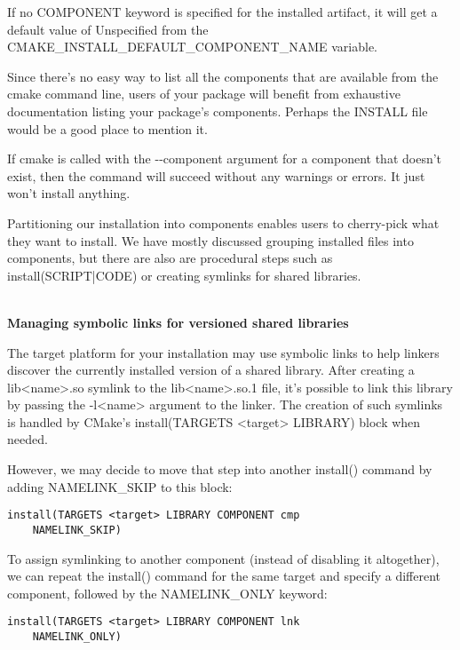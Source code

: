 If no COMPONENT keyword is specified for the installed artifact, it will get a default value of Unspecified from the CMAKE\_INSTALL\_DEFAULT\_COMPONENT\_NAME variable.

\begin{tcolorbox}[colback=blue!5!white,colframe=blue!75!black,title=Note]
Since there's no easy way to list all the components that are available from the cmake command line, users of your package will benefit from exhaustive documentation listing your package's components. Perhaps the INSTALL file would be a good place to mention it.
\end{tcolorbox}

If cmake is called with the -{}-component argument for a component that doesn't exist, then the command will succeed without any warnings or errors. It just won't install anything.

Partitioning our installation into components enables users to cherry-pick what they want to install. We have mostly discussed grouping installed files into components, but there are also are procedural steps such as install(SCRIPT|CODE) or creating symlinks for shared libraries.

\hspace*{\fill} \\ %
\noindent
\textbf{Managing symbolic links for versioned shared libraries}

The target platform for your installation may use symbolic links to help linkers discover the currently installed version of a shared library. After creating a lib<name>.so symlink to the lib<name>.so.1 file, it's possible to link this library by passing the -l<name> argument to the linker. The creation of such symlinks is handled by CMake's install(TARGETS <target> LIBRARY) block when needed.

However, we may decide to move that step into another install() command by adding NAMELINK\_SKIP to this block:

\begin{lstlisting}[style=styleCMake]
install(TARGETS <target> LIBRARY COMPONENT cmp
	NAMELINK_SKIP)
\end{lstlisting}

To assign symlinking to another component (instead of disabling it altogether), we can repeat the install() command for the same target and specify a different component, followed by the NAMELINK\_ONLY keyword:

\begin{lstlisting}[style=styleCMake]
install(TARGETS <target> LIBRARY COMPONENT lnk
	NAMELINK_ONLY)
\end{lstlisting}


